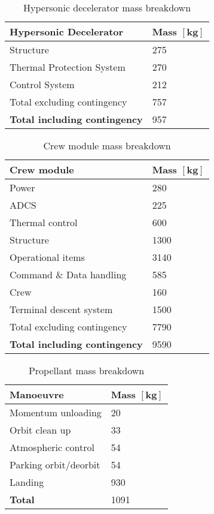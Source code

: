 \begin{table}[ht]
	\centering
	\caption{Hypersonic decelerator mass breakdown}
	\label{tab:DeceleratorMass}
	\begin{tabular}{|l|l|} \hline
		\textbf {Hypersonic Decelerator}             & \textbf{Mass $\mathbf{[kg]}$ } \\ \hline \hline
		Structure          &		 275       \\ \hline
		Thermal Protection System &		  270      \\ \hline
		Control System            		   &  212      \\ \hline \hline
		Total excluding contingency              	   &  757     \\ \hline
		\textbf {Total including contingency}                 &  957      \\ \hline
	\end{tabular}
\end{table}

\begin{table}[ht]
	\centering
	\caption{Crew module mass breakdown}
	\label{tab:CrewModuleMass}
	\begin{tabular}{|l|l|} \hline
		\textbf {Crew module}             & \textbf{Mass $\mathbf{[kg]}$ } \\ \hline \hline
		Power        &		 280       \\ \hline
		ADCS &		  225      \\ \hline
		Thermal control & 600\\ \hline
		Structure & 1300\\ \hline
		Operational items & 3140\\ \hline
		Command \& Data handling & 585 \\ \hline
		Crew & 160 \\ \hline
		Terminal descent system           		   &  1500      \\ \hline \hline
		Total excluding contingency              	   &  7790     \\ \hline
		\textbf {Total including contingency}                 &  9590      \\ \hline
	\end{tabular}
\end{table}

\begin{table}[ht]
	\centering
	\caption{Propellant mass breakdown}
	\label{tab:PropMass}
	\begin{tabular}{|l|l|} \hline
		\textbf {Manoeuvre}             & \textbf{Mass $\mathbf{[kg]}$ } \\ \hline \hline
		Momentum unloading       &		 20       \\ \hline
		Orbit clean up &		  33      \\ \hline
		Atmospheric control           		   &  54      \\ \hline 
		Parking orbit/deorbit            	   & 54    \\ \hline
		Landing            	   &  930     \\ \hline \hline
		\textbf {Total}                 &  1091      \\ \hline
	\end{tabular}
\end{table}

